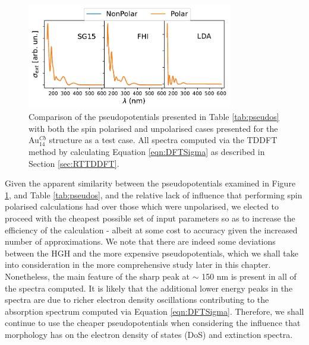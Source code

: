 \begin{figure}
    \centering
    \includegraphics[width=0.8\textwidth]{figures/LM/Atomistic/PPs_Compare.pdf}
    \caption{Comparison of the pseudopotentials presented in Table \ref{tab:pseudos} with both the spin polarised and unpolarised cases presented for the Au$_{14}^{Cb}$ structure as a test case. All spectra computed via the TDDFT method by calculating Equation \ref{eqn:DFTSigma} as described in Section \ref{sec:RTTDDFT}.}
    \label{fig:pps}
\end{figure}

Given the apparent similarity between the pseudopotentials examined in Figure \ref{fig:pps}, and Table \ref{tab:pseudos}, and the relative lack of influence that performing spin polarised calculations had over those which were unpolarised, we elected to proceed with the cheapest possible set of input parameters so as to increase the efficiency of the calculation - albeit at some cost to accuracy given the increased number of approximations. We note that there are indeed some deviations between the HGH and the more expensive pseudopotentials, which we shall take into consideration in the more comprehensive study later in this chapter. Nonetheless, the main feature of the sharp peak at $\sim$ 150 nm is present in all of the spectra computed. It is likely that the additional lower energy peaks in the spectra are due to richer electron density oscillations contributing to the absorption spectrum computed via Equation \ref{eqn:DFTSigma}. Therefore, we shall continue to use the cheaper pseudopotentials when considering the influence that morphology has on the electron density of states (DoS) and extinction spectra. 


